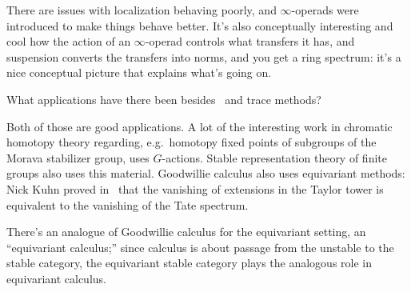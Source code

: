 There are issues with localization behaving poorly, and $\infty$-operads were introduced to make things behave
better. It's also conceptually interesting and cool how the action of an $\infty$-operad controls what transfers
it has, and suspension converts the transfers into norms, and you get a ring spectrum: it's a nice conceptual
picture that explains what's going on.
\begin{ques}
What applications have there been besides~\cite{HHR} and trace methods?
\end{ques}
Both of those are good applications. A lot of the interesting work in chromatic homotopy theory regarding, e.g.\
homotopy fixed points of subgroups of the Morava stabilizer group, uses $G$-actions. Stable representation theory
of finite groups also uses this material. Goodwillie calculus also uses equivariant methods: Nick Kuhn proved
in~\cite{Kuhn04} that the vanishing of extensions in the Taylor tower is equivalent to the vanishing of the Tate
spectrum.

There's an analogue of Goodwillie calculus for the equivariant setting, an ``equivariant calculus;'' since calculus
is about passage from the unstable to the stable category, the equivariant stable category plays the analogous role
in equivariant calculus.

